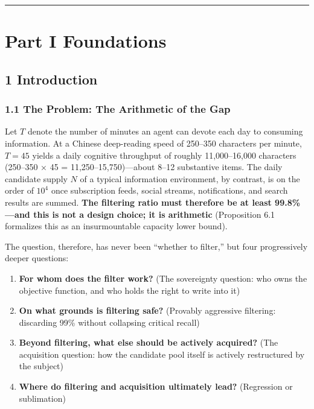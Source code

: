 \documentclass[
  11pt]{article}
\providecommand{\tightlist}{%
  \setlength{\itemsep}{0pt}\setlength{\parskip}{0pt}}
\begin{document}
\begin{center}\rule{0.5\linewidth}{0.5pt}\end{center}

\newpage
\tableofcontents
\newpage

\section{Part I Foundations}\label{part-i-foundations}

\subsection{1 Introduction}\label{introduction}

\subsubsection{1.1 The Problem: The Arithmetic of the
Gap}\label{the-problem-the-arithmetic-of-the-gap}

Let \(T\) denote the number of minutes an agent can devote each day to
consuming information. At a Chinese deep-reading speed of 250--350
characters per minute, \(T=45\) yields a daily cognitive throughput of
roughly 11,000--16,000 characters (250--350 × 45 =
11,250--15,750)---about 8--12 substantive items. The daily candidate
supply \(N\) of a typical information environment, by contrast, is on
the order of \(10^4\) once subscription feeds, social streams,
notifications, and search results are summed. \textbf{The filtering
ratio must therefore be at least 99.8\%---and this is not a design
choice; it is arithmetic} (Proposition 6.1 formalizes this as an
insurmountable capacity lower bound).

The question, therefore, has never been ``whether to filter,'' but four
progressively deeper questions:

\begin{enumerate}
\def\labelenumi{\arabic{enumi}.}
\tightlist
\item
  \textbf{For whom does the filter work?} (The sovereignty question: who
  owns the objective function, and who holds the right to write into it)
\item
  \textbf{On what grounds is filtering safe?} (Provably aggressive
  filtering: discarding 99\% without collapsing critical recall)
\item
  \textbf{Beyond filtering, what else should be actively acquired?} (The
  acquisition question: how the candidate pool itself is actively
  restructured by the subject)
\item
  \textbf{Where do filtering and acquisition ultimately lead?}
  (Regression or sublimation)
\end{enumerate}
\end{document}
